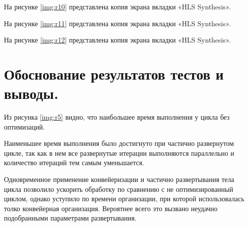 На рисунке \ref{img:r10} представлена копия экрана вкладки «HLS Synthesis».

\newpage

На рисунке \ref{img:r11} представлена копия экрана вкладки «HLS Synthesis».

\newpage

На рисунке \ref{img:r12} представлена копия экрана вкладки «HLS Synthesis».

\newpage

\chapter*{Обоснование результатов тестов и выводы.}

Из рисунка  \ref{img:r5} видно, что наибольшее время выполнения у цикла без оптимизаций.

Наименьшее время выполнения было достигнуто при частично развернутом цикле, так как в нем все развернутые итерации выполняются параллельно и количество итераций тем самым уменьшается.

Одновременное применение конвейеризации и частично развертывания тела цикла позволило ускорить обработку по сравнению с не оптимизированный циклом, однако уступило по времени организации, при которой использовалась толко конвейерная организация. Вероятнее всего это вызвано неудачно подобранными параметрами развертывания.
